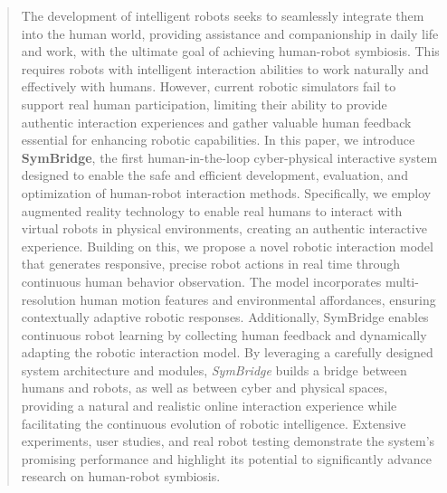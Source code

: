 \documentclass[acmtog]{acmart}
\begin{document}
\begin{abstract}
The development of intelligent robots seeks to seamlessly integrate them into the human world, providing assistance and companionship in daily life and work, with the ultimate goal of achieving human-robot symbiosis. This requires robots with intelligent interaction abilities to work naturally and effectively with humans.
However, current robotic simulators fail to support real human participation, limiting their ability to provide authentic interaction experiences and gather valuable human feedback essential for enhancing robotic capabilities.
In this paper, we introduce \textbf{SymBridge}, the first human-in-the-loop cyber-physical interactive system designed to enable the safe and efficient development, evaluation, and optimization of human-robot interaction methods. Specifically, we employ augmented reality technology to enable real humans to interact with virtual robots in physical environments, creating an authentic interactive experience. Building on this, we propose a novel robotic interaction model that generates responsive, precise robot actions in real time through continuous human behavior observation. The model incorporates multi-resolution human motion features and environmental affordances, ensuring contextually adaptive robotic responses. Additionally, SymBridge enables continuous robot learning by collecting human feedback and dynamically adapting the robotic interaction model. 
By leveraging a carefully designed system architecture and modules, \textit{SymBridge} builds a bridge between humans and robots, as well as between cyber and physical spaces, providing a natural and realistic online interaction experience while facilitating the continuous evolution of robotic intelligence. Extensive experiments, user studies, and real robot testing demonstrate the system's promising performance and highlight its potential to significantly advance research on human-robot symbiosis.
\end{abstract}







%
\maketitle
\end{document}
